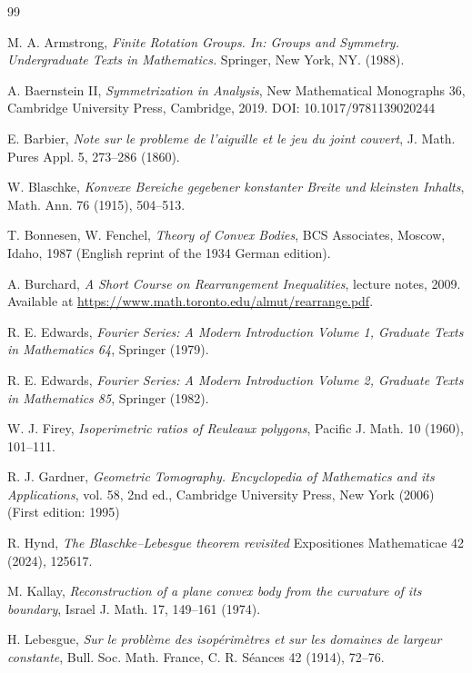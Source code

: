 \documentclass[11pt,letterpaper,reqno]{amsart}
\begin{document}
\begin{thebibliography}{99}

 M. A. Armstrong, \textit{Finite Rotation Groups. In: Groups and Symmetry. Undergraduate Texts in Mathematics.} Springer, New York, NY. (1988).

A. Baernstein II,
\textit{Symmetrization in Analysis},
New Mathematical Monographs 36, Cambridge University Press, Cambridge, 2019. DOI: 10.1017/9781139020244

E. Barbier, \textit{Note sur le probleme de l’aiguille et le jeu du joint couvert}, J. Math. Pures Appl. 5, 273--286 (1860).

W. Blaschke,
\textit{Konvexe Bereiche gegebener konstanter Breite und kleinsten Inhalts},
Math. Ann. 76 (1915), 504--513.

T. Bonnesen, W. Fenchel,
\textit{Theory of Convex Bodies},
BCS Associates, Moscow, Idaho, 1987 (English reprint of the 1934 German edition).

A. Burchard, \textit{A Short Course on Rearrangement Inequalities}, lecture notes, 2009. Available at \url{https://www.math.toronto.edu/almut/rearrange.pdf}.

R. E. Edwards, 
\textit{Fourier Series: A Modern Introduction Volume 1, Graduate Texts in Mathematics 64}, Springer (1979).

R. E. Edwards, 
\textit{Fourier Series: A Modern Introduction Volume 2, Graduate Texts in Mathematics 85}, Springer (1982).

W. J. Firey,
\textit{Isoperimetric ratios of Reuleaux polygons},
Pacific J. Math. 10 (1960), 101--111.

R. J. Gardner, 
\textit{Geometric Tomography. Encyclopedia of Mathematics and its Applications}, 
vol. 58, 2nd ed., Cambridge University Press, New York (2006) (First edition: 1995)

R. Hynd,
\textit{The Blaschke–Lebesgue theorem revisited}
Expositiones Mathematicae 42 (2024), 125617.

M. Kallay, \textit{Reconstruction of a plane convex body from the curvature of its boundary}, Israel J. Math. 17, 149--161 (1974).

H. Lebesgue,
\textit{Sur le problème des isopérimètres et sur les domaines de largeur constante},
Bull. Soc. Math. France, C. R. Séances 42 (1914), 72--76.


\end{thebibliography}
\end{document}
